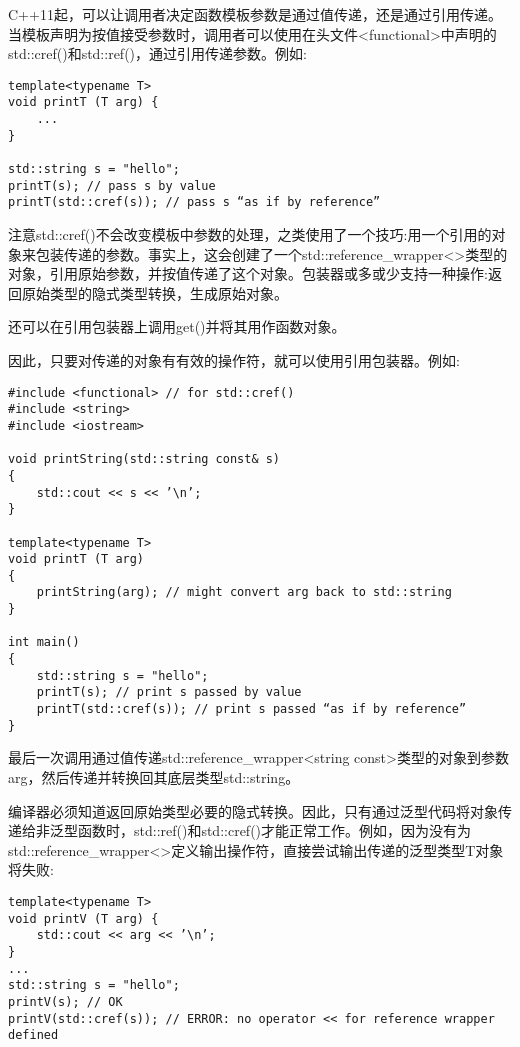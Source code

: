 C++11起，可以让调用者决定函数模板参数是通过值传递，还是通过引用传递。当模板声明为按值接受参数时，调用者可以使用在头文件<functional>中声明的std::cref()和std::ref()，通过引用传递参数。例如:

\begin{lstlisting}[style=styleCXX]
template<typename T>
void printT (T arg) {
	...
}

std::string s = "hello";
printT(s); // pass s by value
printT(std::cref(s)); // pass s “as if by reference”
\end{lstlisting}

注意std::cref()不会改变模板中参数的处理，之类使用了一个技巧:用一个引用的对象来包装传递的参数。事实上，这会创建了一个std::reference\_wrapper<>类型的对象，引用原始参数，并按值传递了这个对象。包装器或多或少支持一种操作:返回原始类型的隐式类型转换，生成原始对象。

\begin{tcolorbox}[colback=webgreen!5!white,colframe=webgreen!75!black]
\hspace*{0.75cm}还可以在引用包装器上调用get()并将其用作函数对象。
\end{tcolorbox}

因此，只要对传递的对象有有效的操作符，就可以使用引用包装器。例如:

\begin{lstlisting}[style=styleCXX]
#include <functional> // for std::cref()
#include <string>
#include <iostream>

void printString(std::string const& s)
{
	std::cout << s << ’\n’;
}

template<typename T>
void printT (T arg)
{
	printString(arg); // might convert arg back to std::string
}

int main()
{
	std::string s = "hello";
	printT(s); // print s passed by value
	printT(std::cref(s)); // print s passed “as if by reference”
}
\end{lstlisting}

最后一次调用通过值传递std::reference\_wrapper<string const>类型的对象到参数arg，然后传递并转换回其底层类型std::string。

编译器必须知道返回原始类型必要的隐式转换。因此，只有通过泛型代码将对象传递给非泛型函数时，std::ref()和std::cref()才能正常工作。例如，因为没有为std::reference\_wrapper<>定义输出操作符，直接尝试输出传递的泛型类型T对象将失败:

\begin{lstlisting}[style=styleCXX]
template<typename T>
void printV (T arg) {
	std::cout << arg << ’\n’;
}
...
std::string s = "hello";
printV(s); // OK
printV(std::cref(s)); // ERROR: no operator << for reference wrapper defined
\end{lstlisting}


